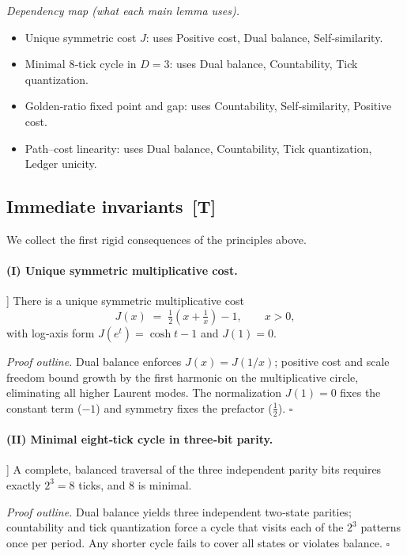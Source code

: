 \documentclass[11pt]{article}
\begin{document}
\noindent\emph{Dependency map (what each main lemma uses).}
\begin{itemize}
  \item Unique symmetric cost $J$: uses Positive cost, Dual balance, Self‑similarity.
  \item Minimal $8$‑tick cycle in $D{=}3$: uses Dual balance, Countability, Tick quantization.
  \item Golden‑ratio fixed point and gap: uses Countability, Self‑similarity, Positive cost.
  \item Path–cost linearity: uses Dual balance, Countability, Tick quantization, Ledger unicity.
\end{itemize}


\subsection{Immediate invariants \,[T]}
We collect the first rigid consequences of the principles above.

\paragraph{(I) Unique symmetric multiplicative cost.}
\begin{theorem}[Cost functional \,[T]]
There is a unique symmetric multiplicative cost
\[
J(x)\;=\;\tfrac12\!\left(x+\tfrac1x\right)-1,\qquad x>0,
\]
with log‑axis form $J(e^{t})=\cosh t-1$ and $J(1)=0$.
\end{theorem}
\noindent\emph{Proof outline.} Dual balance enforces $J(x)=J(1/x)$; positive cost and scale freedom bound growth by the first harmonic on the multiplicative circle, eliminating all higher Laurent modes. The normalization $J(1)=0$ fixes the constant term ($-1$) and symmetry fixes the prefactor ($\tfrac12$). \hfill$\square$

\paragraph{(II) Minimal eight‑tick cycle in three‑bit parity.}
\begin{theorem}[Eight‑tick minimality in $D{=}3$ \,[T]]
A complete, balanced traversal of the three independent parity bits requires exactly $2^{3}=8$ ticks, and $8$ is minimal.
\end{theorem}
\noindent\emph{Proof outline.} Dual balance yields three independent two‑state parities; countability and tick quantization force a cycle that visits each of the $2^{3}$ patterns once per period. Any shorter cycle fails to cover all states or violates balance. \hfill$\square$
\end{document}
